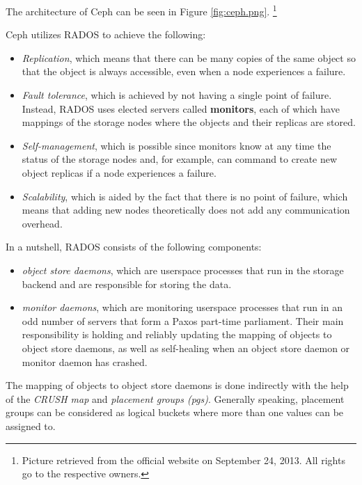 The architecture of Ceph can be seen in Figure \ref{fig:ceph.png}.
\footnote{Picture retrieved from the official website on September 24, 2013.  
	All rights go to the respective owners.}


Ceph utilizes RADOS to achieve the following:

\begin{itemize}
	\item \textit{Replication}, which means that there can be many copies 
		of the same object so that the object is always accessible, 
		even when a node experiences a failure.
	\item \textit{Fault tolerance}, which is achieved by not having a 
		single point of failure. Instead, RADOS uses elected servers 
		called \textbf{monitors}, each of which have mappings of the 
		storage nodes where the objects and their replicas are stored.  
	\item \textit{Self-management}, which is possible since monitors know 
		at any time the status of the storage nodes and, for example, 
		can command to create new object replicas if a node experiences 
		a failure.
	\item \textit{Scalability}, which is aided by the fact that there is no 
		point of failure, which means that adding new nodes 
		theoretically does not add any communication overhead.
\end{itemize}

In a nutshell, RADOS consists of the following components:

\begin{itemize}
	\item \textit{object store daemons}, which are userspace processes that run 
		in the storage backend and are responsible for storing the data.
	\item \textit{monitor daemons}, which are monitoring userspace processes 
		that run in an odd number of servers that form a Paxos part-time 
		parliament\cite{Paxos}. Their main responsibility is holding and 
		reliably updating the mapping of objects to object store daemons, as 
		well as self-healing when an object store daemon or monitor daemon has 
		crashed.
\end{itemize}

The mapping of objects to object store daemons is done indirectly with the help 
of the \textit{CRUSH map} and \textit{placement groups (pgs)}.  Generally 
speaking, placement groups can be considered as logical buckets where more than 
one values can be assigned to.

